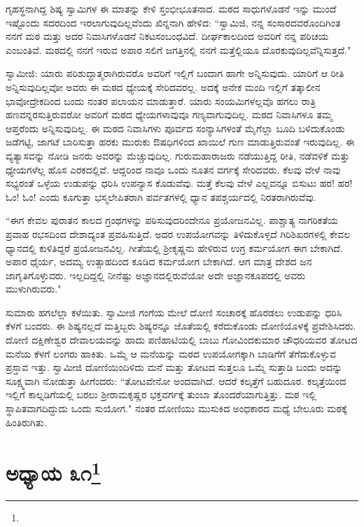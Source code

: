 ಗೃಹಸ್ಥನಾಗಿದ್ದ ಶಿಷ್ಯ ಸ್ವಾಮಿಗಳ ಈ ಮಾತನ್ನು ಕೇಳಿ ಸ್ತಂಭೀಭೂತನಾದ. ಮಠದ ಸಾಧುಗಳೊಡನೆ ಇನ್ನು ಮುಂದೆ ಇಷ್ಟೊಂದು ಸದರದಿಂದ ಇರಲಾಗುವುದಿಲ್ಲವೆಂದು ಖಿನ್ನನಾಗಿ ಹೇಳಿದ: “ಸ್ವಾಮಿಜಿ, ನನ್ನ ಸಂಸಾರದವರೊಂದಿಗಿಂತ ನನಗೆ ಮಠ ಮತ್ತು ಅದರ ನಿವಾಸಿಗಳೊಡನೆ ನಿಕಟಸಂಬಂಧವಿದೆ. ದೀರ್ಘಕಾಲದಿಂದ ಅವರಿಗೆ ನನ್ನ ಪರಿಚಯ ಎಂಬಂತಿವೆ. ಮಠದಲ್ಲಿ ನನಗೆ ಇರುವ ಅಪಾರ ಸಲಿಗೆ ಜಗತ್ತಿನಲ್ಲಿ ನನಗೆ ಮತ್ತೆಲ್ಲಿಯೂ ದೊರಕುವುದಿಲ್ಲವೆನ್ನಿಸುತ್ತದೆ."

ಸ್ವಾಮೀಜಿ: ಯಾರು ಪರಿಶುದ್ಧಾತ್ಮರಾಗಿರುವರೊ ಅವರಿಗೆ ಇಲ್ಲಿಗೆ ಬಂದಾಗ ಹಾಗೇ ಅನ್ನಿಸುವುದು. ಯಾರಿಗೆ ಆ ರೀತಿ ಅನ್ನಿಸುವುದಿಲ್ಲವೋ ಅವರು ಈ ಮಠದ ಧ್ಯೇಯಕ್ಕೆ ಸೇರಿದವರಲ್ಲ. ಅದಕ್ಕೆ ಅನೇಕ ಮಂದಿ ಇಲ್ಲಿಗೆ ತತ್ಕಾಲೀನ ಭಾವೋದ್ರೇಕದಿಂದ ಬಂದು ನಂತರ ಪಲಾಯನ ಮಾಡುತ್ತಾರೆ. ಯಾರು ಸಂಯಮಿಗಳಲ್ಲವೊ ಹಗಲು ರಾತ್ರಿ ಹಣವನ್ನರಸುತ್ತಿರುವರೋ ಅವರಿಗೆ ಮಠದ ಧ್ಯೇಯಗಳಾವುವೂ ಗಣ್ಯವಾಗುವುದಿಲ್ಲ. ಮಠದ ನಿವಾಸಿಗಳೂ ತಮ್ಮ ಆಪ್ತರೆಂದು ಅನ್ನಿಸುವುದಿಲ್ಲ. ಈ ಮಠದ ನಿವಾಸಿಗಳು ಪೂರ್ವದ ಸಂನ್ಯಾಸಿಗಳಂತೆ ಮೈಗೆಲ್ಲಾ ಬೂದಿ ಬಳಿದುಕೊಂಡು ಜಡೆಗಟ್ಟಿ, ಜಾಗಟೆ ಬಾರಿಸುತ್ತಾ ಹರಕು ಮುರುಕು ಔಷಧಿಗಳಿಂದ ಖಾಯಿಲೆ ಗುಣ ಮಾಡುತ್ತಿರುವಂತೆ ಇರುವುದಿಲ್ಲ. ಈ ವ್ಯತ್ಯಾಸವನ್ನು ನೋಡಿ ಜನರು ಅವರನ್ನು ಮೆಚ್ಚುವುದಿಲ್ಲ. ಗುರುಮಹಾರಾಜರು ನಡೆಯುತ್ತಿದ್ದ ರೀತಿ, ನಡೆವಳಿಕೆ ಮತ್ತು ಧ್ಯೇಯಗಳೆಲ್ಲ ಹೊಸ ಎರಕದಲ್ಲಿವೆ. ಆದ್ದರಿಂದ ನಾವೂ ಒಂದು ನೂತನ ವರ್ಗಕ್ಕೆ ಸೇರಿದವರು. ಕೆಲವು ವೇಳೆ ನಾವು ಸಭ್ಯರಂತೆ ಒಳ್ಳೆಯ ಉಡುಪನ್ನು ಧರಿಸಿ ಉಪನ್ಯಾಸ ಕೊಡುವೆವು. ಮತ್ತೆ ಕೆಲವು ವೇಳೆ ಎಲ್ಲವನ್ನೂ ಬಿಸುಟು ಹರ! ಹರ! ಓಂ! ಓಂ! ಎಂದು ಕೂಗುತ್ತಾ ಭಸ್ಮಲೇಪಿತರಾಗಿ ಪರ್ವತಗಳಲ್ಲಿ ಧ್ಯಾನ ತಪಶ್ಚರ್ಯದಲ್ಲಿ ನಿರತರಾಗಿರುವೆವು.

“ಈಗ ಕೇವಲ ಪುರಾತನ ಕಾಲದ ಗ್ರಂಥಗಳನ್ನು ಪಠಿಸುವುದರಿಂದೇನೂ ಪ್ರಯೋಜನವಿಲ್ಲ. ಪಾಶ್ಚಾತ್ಯ ನಾಗರಿಕತೆಯ ಪ್ರವಾಹ ರಭಸದಿಂದ ದೇಶಾದ್ಯಂತ ಪ್ರವಹಿಸುತ್ತಿದೆ. ಅದರ ಉಪಯೋಗವನ್ನು ತಿಳಿದುಕೊಳ್ಳದೆ ಗಿರಿಶಿಖರಗಳಲ್ಲಿ ಕೇವಲ ಧ್ಯಾನದಲ್ಲಿ ಕುಳಿತಿದ್ದರೆ ಪ್ರಯೋಜನವಿಲ್ಲ. ಗೀತೆಯಲ್ಲಿ ಶ‍್ರೀಕೃಷ್ಣನು ಹೇಳಿರುವ ಉಗ್ರ ಕರ್ಮಯೋಗ ಈಗ ಬೇಕಾಗಿದೆ. ಅಪಾರ ಧೈರ್ಯ, ಅದಮ್ಯ ಉತ್ಸಾಹದಿಂದ ಕೂಡಿದ ಕರ್ಮಯೋಗ ಬೇಕಾಗಿದೆ. ಆಗ ಮಾತ್ರ ದೇಶದ ಜನ ಜಾಗೃತಿಗೊಳ್ಳುವರು. ಇಲ್ಲದಿದ್ದಲ್ಲಿ ನೀನೆಷ್ಟು ಅಜ್ಞಾನದಲ್ಲಿರುವೆಯೋ ಅದೇ ಅಜ್ಞಾನಕೂಪದಲ್ಲಿ ಅವರು ಮುಳುಗಿರುವರು."

ಸುಮಾರು ಹಗಲೆಲ್ಲಾ ಕಳೆಯಿತು. ಸ್ವಾಮೀಜಿ ಗಂಗೆಯ ಮೇಲೆ ದೋಣಿ ಸಂಚಾರಕ್ಕೆ ಹೊರಡಲು ಉಡುಪನ್ನು ಧರಿಸಿ ಕೆಳಗೆ ಬಂದರು. ಈ ಶಿಷ್ಯನಲ್ಲದೆ ಮತ್ತಿಬ್ಬರು ಶಿಷ್ಯರನ್ನೂ ಜೊತೆಯಲ್ಲಿ ಕರೆದುಕೊಂಡು ದೋಣಿಯೊಳಕ್ಕೆ ಪ್ರವೇಶಿಸಿದರು. ದೋಣಿ ದಕ್ಷಿಣೇಶ್ವರ ದೇವಾಲಯವನ್ನು ಹಾದು ಪಣಿಹಾಟಿಯಲ್ಲಿ ಬಾಬು ಗೋವಿಂದಕುಮಾರ ಚೌಧರಿಯವರ ತೋಟದ ಮನೆಯ ಕೆಳಗೆ ಲಂಗರು ಹಾಕಿತು. ಒಮ್ಮೆ ಆ ಮನೆಯನ್ನು ಮಠದ ಉಪಯೋಗಕ್ಕಾಗಿ ಬಾಡಿಗೆಗೆ ತೆಗೆದುಕೊಳ್ಳುವ ಪ್ರಸ್ತಾವ ಇತ್ತು. ಸ್ವಾಮೀಜಿ ದೋಣಿಯಿಂದಿಳಿದು ಮನೆ ಮತ್ತು ತೋಟದ ಸುತ್ತಲೂ ಒಮ್ಮೆ ಸುತ್ತಾಡಿ ಬಂದು ಅದನ್ನು ಸೂಕ್ಷ್ಮವಾಗಿ ನೋಡುತ್ತಾ ಹೀಗೆಂದರು: “ತೋಟವೇನೋ ಅಂದವಾಗಿದೆ. ಆದರೆ ಕಲ್ಕತ್ತೆಗೆ ಬಹುದೂರ. ಕಲ್ಕತ್ತೆಯಿಂದ ಇಲ್ಲಿಗೆ ಕಾಲ್ನಡಿಗೆಯಲ್ಲಿ ಬರಲು ಶ‍್ರೀರಾಮಕೃಷ್ಣರ ಭಕ್ತವರ್ಗಕ್ಕೆ ತುಂಬಾ ತೊಂದರೆಯಾಗುತ್ತಿತ್ತು. ಮಠ ಇಲ್ಲಿ ಸ್ಥಾಪಿತವಾಗದಿದ್ದುದು ಒಂದು ಸುಯೋಗ." ನಂತರ ದೋಣಿಯು ಮುಸುಕಿದ ಅಂಧಕಾರದ ಮಧ್ಯೆ ಬೇಲೂರು ಮಠಕ್ಕೆ ಹಿಂತಿರುಗಿತು.

\newpage

\chapter[ಅಧ್ಯಾಯ ೩೧]{ಅಧ್ಯಾಯ ೩೧\protect\footnote{}}

